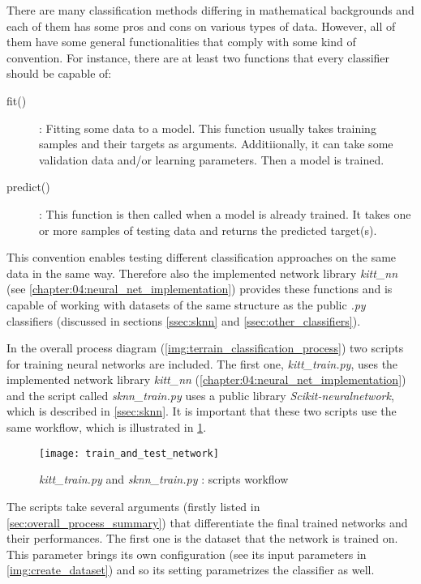 There are many classification methods differing in mathematical backgrounds and each of them has some pros and cons on various types of data. However, all of them have some general functionalities that comply with some kind of convention. For instance, there are at least two functions that every classifier should be capable of:

\begin{description}
\item[fit()] : Fitting some data to a model. This function usually takes training samples and their targets as arguments. Additiionally, it can take some validation data and/or learning parameters. Then a model is trained.
\item[predict()] : This function is then called when a model is already trained. It takes one or more samples of testing data and returns the predicted target(s).
\end{description}

This convention enables testing different classification approaches on the same data in the same way. Therefore also the implemented network library \textit{kitt\_nn} (see \cref{chapter:04:neural_net_implementation}) provides these functions and is capable of working with datasets of the same structure as the public \textit{.py} classifiers (discussed in sections \ref{ssec:sknn} and \ref{ssec:other_classifiers}).

In the overall process diagram (\cref{img:terrain_classification_process}) two scripts for training neural networks are included. The first one, \textit{kitt\_train.py}, uses the implemented network library \textit{kitt\_nn} (\cref{chapter:04:neural_net_implementation}) and the script called \textit{sknn\_train.py} uses a public library \textit{Scikit-neuralnetwork}, which is described in \cref{ssec:sknn}. It is important that these two scripts use the same workflow, which is illustrated in \cref{img:train_and_test_network}.

\begin{figure}[H]
  \centering
  \texttt{[image: train\_and\_test\_network]}
  \caption{\textit{kitt\_train.py} and \textit{sknn\_train.py} : scripts workflow}
  \label{img:train_and_test_network}
\end{figure}

The scripts take several arguments (firstly listed in \cref{sec:overall_process_summary}) that differentiate the final trained networks and their performances. The first one is the dataset that the network is trained on. This parameter brings its own configuration (see its input parameters in \cref{img:create_dataset}) and so its setting parametrizes the classifier as well.

